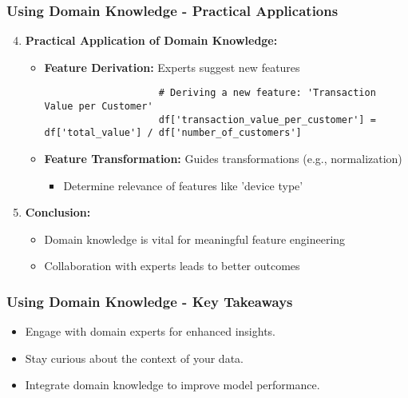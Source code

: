 \documentclass[aspectratio=169]{beamer}
\begin{document}
\begin{frame}[fragile]
    \frametitle{Using Domain Knowledge - Practical Applications}
    \begin{enumerate}
        \setcounter{enumi}{3}
        \item \textbf{Practical Application of Domain Knowledge:}
            \begin{itemize}
                \item \textbf{Feature Derivation:} Experts suggest new features
                    \begin{lstlisting}
                    # Deriving a new feature: 'Transaction Value per Customer'
                    df['transaction_value_per_customer'] = df['total_value'] / df['number_of_customers']
                    \end{lstlisting}

                \item \textbf{Feature Transformation:} Guides transformations (e.g., normalization)
                    \begin{itemize}
                        \item Determine relevance of features like 'device type'
                    \end{itemize}
            \end{itemize}

        \item \textbf{Conclusion:}
            \begin{itemize}
                \item Domain knowledge is vital for meaningful feature engineering
                \item Collaboration with experts leads to better outcomes
            \end{itemize}
    \end{enumerate}
\end{frame}

\begin{frame}[fragile]
    \frametitle{Using Domain Knowledge - Key Takeaways}
    \begin{itemize}
        \item Engage with domain experts for enhanced insights.
        \item Stay curious about the context of your data.
        \item Integrate domain knowledge to improve model performance.
    \end{itemize}
\end{frame}
\end{document}
